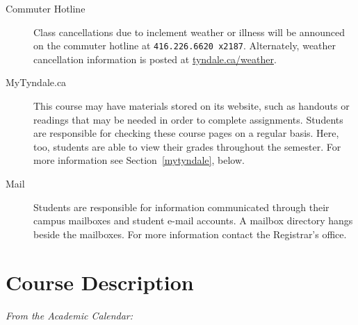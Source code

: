 \begin{titlepage}
\begin{center}
    \begin{description}
      \item[Commuter Hotline]
        Class cancellations due to inclement weather or illness will
        be announced on the commuter hotline at \texttt{416.226.6620
        x2187}. Alternately, weather cancellation information is posted
        at \href{http://tyndale.ca/weather}{tyndale.ca/weather}.
      \item[MyTyndale.ca]
        This course may have materials stored on its website, such as
        handouts or readings that may be needed in order to complete
        assignments. Students are responsible for checking these course
        pages on a regular basis. Here, too, students are able to view
        their grades throughout the semester. For more information see
        Section~\ref{mytyndale}, below.
      \item[Mail]
        Students are responsible for information communicated through
        their campus mailboxes and student e-mail accounts. A mailbox
        directory hangs beside the mailboxes. For more information
        contact the Registrar's office.
    \end{description}

  \end{center}

  \section{Course Description}
  \label{description}

  \emph{From the Academic Calendar:} \cdescription

\end{titlepage}
